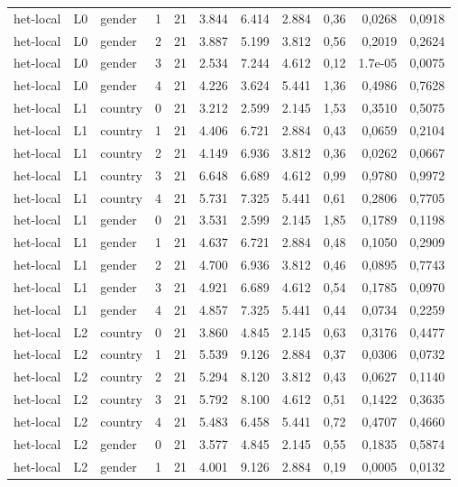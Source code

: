 \begin{landscape}
\begin{longtable}{lllrrrrrrrr}
het-local & L0 & gender & 1 & 21 & 3.844 & 6.414 & 2.884 & 0,36 & 0,0268 & 0,0918 \\
het-local & L0 & gender & 2 & 21 & 3.887 & 5.199 & 3.812 & 0,56 & 0,2019 & 0,2624 \\
het-local & L0 & gender & 3 & 21 & 2.534 & 7.244 & 4.612 & 0,12 & 1.7e-05 & 0,0075 \\
het-local & L0 & gender & 4 & 21 & 4.226 & 3.624 & 5.441 & 1,36 & 0,4986 & 0,7628 \\
het-local & L1 & country & 0 & 21 & 3.212 & 2.599 & 2.145 & 1,53 & 0,3510 & 0,5075 \\
het-local & L1 & country & 1 & 21 & 4.406 & 6.721 & 2.884 & 0,43 & 0,0659 & 0,2104 \\
het-local & L1 & country & 2 & 21 & 4.149 & 6.936 & 3.812 & 0,36 & 0,0262 & 0,0667 \\
het-local & L1 & country & 3 & 21 & 6.648 & 6.689 & 4.612 & 0,99 & 0,9780 & 0,9972 \\
het-local & L1 & country & 4 & 21 & 5.731 & 7.325 & 5.441 & 0,61 & 0,2806 & 0,7705 \\
het-local & L1 & gender & 0 & 21 & 3.531 & 2.599 & 2.145 & 1,85 & 0,1789 & 0,1198 \\
het-local & L1 & gender & 1 & 21 & 4.637 & 6.721 & 2.884 & 0,48 & 0,1050 & 0,2909 \\
het-local & L1 & gender & 2 & 21 & 4.700 & 6.936 & 3.812 & 0,46 & 0,0895 & 0,7743 \\
het-local & L1 & gender & 3 & 21 & 4.921 & 6.689 & 4.612 & 0,54 & 0,1785 & 0,0970 \\
het-local & L1 & gender & 4 & 21 & 4.857 & 7.325 & 5.441 & 0,44 & 0,0734 & 0,2259 \\
het-local & L2 & country & 0 & 21 & 3.860 & 4.845 & 2.145 & 0,63 & 0,3176 & 0,4477 \\
het-local & L2 & country & 1 & 21 & 5.539 & 9.126 & 2.884 & 0,37 & 0,0306 & 0,0732 \\
het-local & L2 & country & 2 & 21 & 5.294 & 8.120 & 3.812 & 0,43 & 0,0627 & 0,1140 \\
het-local & L2 & country & 3 & 21 & 5.792 & 8.100 & 4.612 & 0,51 & 0,1422 & 0,3635 \\
het-local & L2 & country & 4 & 21 & 5.483 & 6.458 & 5.441 & 0,72 & 0,4707 & 0,4660 \\
het-local & L2 & gender & 0 & 21 & 3.577 & 4.845 & 2.145 & 0,55 & 0,1835 & 0,5874 \\
het-local & L2 & gender & 1 & 21 & 4.001 & 9.126 & 2.884 & 0,19 & 0,0005 & 0,0132 \\

\end{longtable}
\end{landscape}
